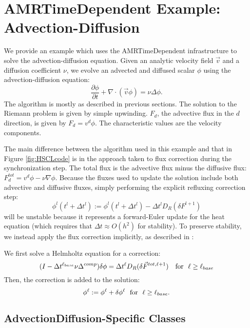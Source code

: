 \section{AMRTimeDependent  Example: Advection-Diffusion}

We provide an example which uses the AMRTimeDependent infrastructure
to solve the advection-diffusion equation.   Given an analytic
velocity field $\vec v$ and a diffusion coefficient $\nu$, we evolve
an advected and diffused scalar $\phi$ using the advection-diffusion
equation:  
$$
\frac{\partial \phi}{\partial t} + \nabla \cdot(\vec v \phi) = \nu
\Delta \phi .
$$ 
The algorithm is mostly as described in previous sections.  The
solution to the Riemann problem is given by simple upwinding.  $F_d$,
the advective flux in the $d$ direction, is given by $F_d = v^d \phi$.
The characteristic values are the velocity components.  

The main difference between the algorithm used in this example and
that in Figure \ref{fig:HSCLcode} is in the approach taken to
flux correction during the synchronization step. The total flux
is the advective flux minus the diffusive flux: $F_d^{tot} = v^d
\phi - \nu \nabla \phi$. Because the fluxes used to update the
solution include both advective and diffusive fluxes, simply
performing the explicit refluxing correction step:
$$\phi^l(t^l + \Delta t^l) := \phi^l(t^l + \Delta t^l) - \Delta t^l D_R
(\delta F^{l+1})$$ 
will be unstable because it represents a forward-Euler update for the
heat equation (which requires that $\Delta t \approx O(h^2)$ for
stability). To preserve stability, we instead apply the flux
correction implicitly, as described in
\cite{martinColellaGraves:2008}:  

We first solve a Helmholtz equation for a correction:
\begin{equation}
(I -  \Delta t^{\ell_{base}} \nu \Delta^{comp}) \delta \phi = \Delta
t^{\ell} D_R(\delta \vec{F}^{tot,\ell+1}) \ \ \ {\rm for } \ \ \ell \geq
\ell_{base} 
\end{equation}
Then, the correction is added to the solution: 
\begin{equation}
\phi^\ell := \phi^\ell + \delta \phi^\ell \ \ {\rm for } \ \ \ell \geq
\ell_{base}. 
\end{equation}

\subsection{AdvectionDiffusion-Specific Classes}

